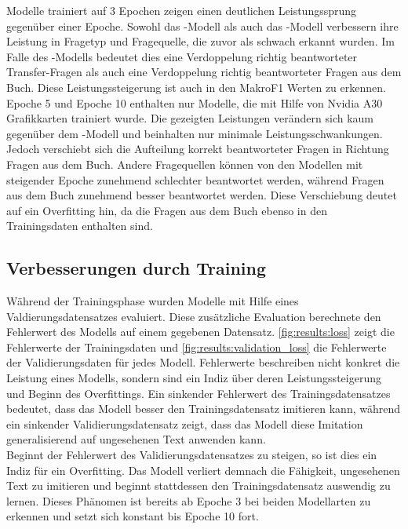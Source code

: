 Modelle trainiert auf 3 Epochen zeigen einen deutlichen Leistungssprung gegenüber einer Epoche.
Sowohl das \lev-Modell als auch das \lea-Modell verbessern ihre Leistung in Fragetyp und Fragequelle, die zuvor als schwach erkannt wurden.
Im Falle des \lea-Modells bedeutet dies eine Verdoppelung richtig beantworteter Transfer-Fragen als auch eine Verdoppelung richtig beantworteter Fragen aus dem Buch.
Diese Leistungssteigerung ist auch in den MakroF1 Werten zu erkennen.\\

Epoche 5 und Epoche 10 enthalten nur Modelle, die mit Hilfe von Nvidia A30 Grafikkarten trainiert wurde.
Die gezeigten Leistungen verändern sich kaum gegenüber dem \lea-Modell und beinhalten nur minimale Leistungsschwankungen.
Jedoch verschiebt sich die Aufteilung korrekt beantworteter Fragen in Richtung Fragen aus dem Buch.
Andere Fragequellen können von den Modellen mit steigender Epoche zunehmend schlechter beantwortet werden, während Fragen aus dem Buch zunehmend besser beantwortet werden.
Diese Verschiebung deutet auf ein Overfitting hin, da die Fragen aus dem Buch ebenso in den Trainingsdaten enthalten sind.\\

\subsection{Verbesserungen durch Training}
Während der Trainingsphase wurden Modelle mit Hilfe eines Valdierungsdatensatzes evaluiert.
Diese zusätzliche Evaluation berechnete den Fehlerwert des Modells auf einem gegebenen Datensatz.
\cref{fig:results:loss} zeigt die Fehlerwerte der Trainingsdaten und \cref{fig:results:validation_loss} die Fehlerwerte der Validierungsdaten für jedes Modell.
Fehlerwerte beschreiben nicht konkret die Leistung eines Modells, sondern sind ein Indiz über deren Leistungssteigerung und Beginn des Overfittings.
Ein sinkender Fehlerwert des Trainingsdatensatzes bedeutet, dass das Modell besser den Trainingsdatensatz imitieren kann, während ein sinkender Validierungsdatensatz zeigt, dass das Modell diese Imitation generalisierend auf ungesehenen Text anwenden kann.\\

Beginnt der Fehlerwert des Validierungsdatensatzes zu steigen, so ist dies ein Indiz für ein Overfitting.
Das Modell verliert demnach die Fähigkeit, ungesehenen Text zu imitieren und beginnt stattdessen den Trainingsdatensatz auswendig zu lernen.
Dieses Phänomen ist bereits ab Epoche 3 bei beiden Modellarten zu erkennen und setzt sich konstant bis Epoche 10 fort.\\

